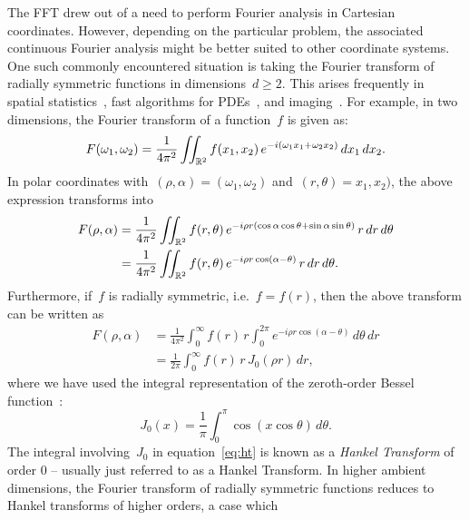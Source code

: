 The FFT drew out of a need to perform Fourier analysis in Cartesian coordinates.
However, depending on the particular problem, the associated continuous Fourier
analysis might be better suited to other coordinate systems. One such commonly
encountered situation is taking the Fourier transform of radially symmetric
functions in dimensions~$ d \geq 2$. This arises frequently in spatial
statistics~\cite{}, fast algorithms for PDEs~\cite{}, and imaging~\cite{}. For
example, in two dimensions, the Fourier transform of a
function~$f$ is given as:
\begin{equation}
  F(\omega_1, \omega_2) = \frac{1}{4\pi^2} \iint_{\mathbb{R}^2} f(x_1, x_2) \, e^{-i(\omega_1 x_1 + \omega_2 x_2)}  \, dx_1 \, dx_2.
\end{equation}
In polar coordinates with~$(\rho,\alpha) = (\omega_1,\omega_2)$ and~$(r,\theta)
= x_1,x_2)$, the above expression transforms into
\begin{equation}
  \label{eq:ftpolar}
  \begin{aligned}
    F(\rho, \alpha) &= \frac{1}{4\pi^2} \iint_{\R^2} 
    f(r,\theta) \, 
    e^{-i \rho r (\cos\alpha \cos\theta + \sin\alpha \sin\theta) } 
    \, r \, dr \, d\theta \\
  &= \frac{1}{4\pi^2} \iint_{\R^2} f(r,\theta) \, e^{-i \rho r \cos(\alpha-\theta) } \, r \, dr \, d\theta.
  \end{aligned}
\end{equation}
Furthermore, if~$f$ is radially symmetric, i.e.~$f = f(r)$, then the above
transform can be written as
\begin{equation}
  \label{eq:ht}
  \begin{aligned}
  F(\rho,\alpha) &= \frac{1}{4\pi^2} \int_0^\infty f(r) \, r \int_0^{2\pi} 
  e^{-i \rho r \cos(\alpha - \theta) }  \, d\theta \, dr \\
  &= \frac{1}{2\pi} \int_0^\infty f(r) \, r \, J_0(\rho r)  \, dr,
  \end{aligned}
\end{equation}
where we have used the integral representation of the zeroth-order Bessel
function~\cite{olver2010nist}:
\begin{equation}
  J_0(x) = \frac{1}{\pi} \int_0^\pi \cos \left( x \cos \theta \right) \, d\theta.
\end{equation}
The integral involving~$J_0$ in equation~\eqref{eq:ht} is known as a
\emph{Hankel Transform} of order 0 -- usually just referred to as a Hankel
Transform. In higher ambient dimensions, the Fourier transform of radially
symmetric functions reduces to Hankel transforms of higher orders, a case which
